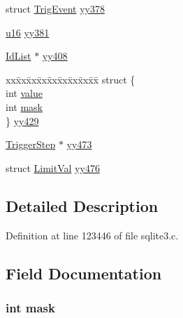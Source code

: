 \begin{DoxyCompactItemize}
struct \hyperlink{struct_trig_event}{Trig\+Event} \hyperlink{union_y_y_m_i_n_o_r_t_y_p_e_adbc8162423876e8e7496c9d05c47c44b}{yy378}
\item 
\hyperlink{sqlite3_8c_a20f2299e322dcbde37cb07b16910b843}{u16} \hyperlink{union_y_y_m_i_n_o_r_t_y_p_e_a69aab50612a135e86952c1a6a2bc2cb6}{yy381}
\item 
\hyperlink{struct_id_list}{Id\+List} $\ast$ \hyperlink{union_y_y_m_i_n_o_r_t_y_p_e_a8ee397653db6e6cfc56076059b6a71c2}{yy408}
\item 
\begin{tabbing}
xx\=xx\=xx\=xx\=xx\=xx\=xx\=xx\=xx\=\kill
struct \{\\
\>int \hyperlink{union_y_y_m_i_n_o_r_t_y_p_e_ac4f474c82e82cbb89ca7c36dd52be0ed}{value}\\
\>int \hyperlink{union_y_y_m_i_n_o_r_t_y_p_e_ab77cc972f3ee899689ba053015472ccd}{mask}\\
\} \hyperlink{union_y_y_m_i_n_o_r_t_y_p_e_a58200eb6c0e8ba618c54dc86e590bf29}{yy429}\\

\end{tabbing}\item 
\hyperlink{struct_trigger_step}{Trigger\+Step} $\ast$ \hyperlink{union_y_y_m_i_n_o_r_t_y_p_e_a5fce8250dff3b187e37570cebf5b8c70}{yy473}
\item 
struct \hyperlink{struct_limit_val}{Limit\+Val} \hyperlink{union_y_y_m_i_n_o_r_t_y_p_e_a7af5b42cf17e32bd00adf929862a0a9d}{yy476}
\end{DoxyCompactItemize}


\subsection{Detailed Description}


Definition at line 123446 of file sqlite3.\+c.



\subsection{Field Documentation}
\hypertarget{union_y_y_m_i_n_o_r_t_y_p_e_ab77cc972f3ee899689ba053015472ccd}{}
\subsubsection[{mask}]{\setlength{\rightskip}{0pt plus 5cm}int mask}\label{union_y_y_m_i_n_o_r_t_y_p_e_ab77cc972f3ee899689ba053015472ccd}


